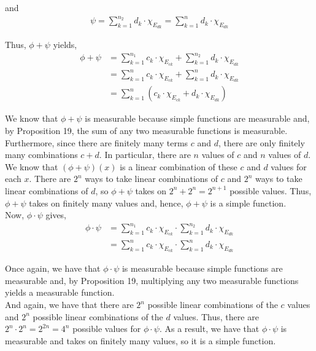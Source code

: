 \documentclass[12pt]{article}
\begin{document}
and 
\begin{align*}
\psi = \sum_{k=1}^{n_2} d_{k} \cdot \chi_{E_{dk}} = \sum_{k=1}^{n} d_{k} \cdot \chi_{E_{dk}}
\end{align*}

Thus, $\phi + \psi$ yields,
\begin{align*}
\phi + \psi &= \sum_{k=1}^{n_1} c_{k} \cdot \chi_{E_{ck}} + \sum_{k=1}^{n_2} d_{k} \cdot \chi_{E_{dk}}\\
&= \sum_{k=1}^{n} c_{k} \cdot \chi_{E_{ck}} + \sum_{k=1}^{n} d_{k} \cdot \chi_{E_{dk}}\\
&= \sum_{k=1}^{n} \left(c_{k} \cdot \chi_{E_{ck}} + d_{k} \cdot \chi_{E_{dk}}\right)
\end{align*}

We know that $\phi + \psi$ is measurable because simple functions are measurable and, by Proposition 19, the sum of any two measurable functions is measurable.\\

Furthermore, since there are finitely many terms $c$ and $d$, there are only finitely many combinations $c + d$. In particular, there are $n$ values of $c$ and $n$ values of $d$. We know that $(\phi + \psi)(x)$ is a linear combination of these $c$ and $d$ values for each $x$. There are $2^n$ ways to take linear combinations of $c$ and $2^n$ ways to take linear combinations of $d$, so $\phi + \psi$ takes on $2^n + 2^n = 2^{n+1}$ possible values. Thus, $\phi + \psi$ takes on finitely many values and, hence, $\phi + \psi$ is a simple function.\\

Now, $\phi \cdot \psi$ gives,
\begin{align*}
\phi \cdot \psi &= \sum_{k=1}^{n_1} c_{k} \cdot \chi_{E_{ck}} \cdot \sum_{k=1}^{n_2} d_{k} \cdot \chi_{E_{dk}}\\
&= \sum_{k=1}^{n} c_{k} \cdot \chi_{E_{ck}} \cdot \sum_{k=1}^{n} d_{k} \cdot \chi_{E_{dk}}
\end{align*}

Once again, we have that $\phi \cdot \psi$ is measurable because simple functions are measurable and, by Proposition 19, multiplying any two measurable functions yields a measurable function.\\

And again, we have that there are $2^n$ possible linear combinations of the $c$ values and $2^n$ possible linear combinations of the $d$ values. Thus, there are $2^n \cdot 2^n = 2^{2n} = 4^n$ possible values for $\phi \cdot \psi$. As a result, we have that $\phi \cdot \psi$ is measurable and takes on finitely many values, so it is a simple function.
\end{document}
